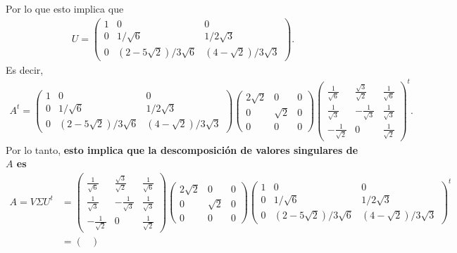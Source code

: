 \documentclass[11pt,letterpaper]{article}
\begin{document}
\begin{enumerate}
Por lo que esto implica que 
\begin{align*}
U = \begin{pmatrix}
1 & 0 & 0\\ 
0 & 1/\sqrt{6} &  1/2\sqrt{3}\\ 
0& (2-5\sqrt{2})/3\sqrt{6} & (4-\sqrt{2})/3\sqrt{3}
\end{pmatrix}.
\end{align*}
Es decir,
\begin{align*}
A^t = \begin{pmatrix}
1 & 0 & 0\\ 
0 & 1/\sqrt{6} &  1/2\sqrt{3}\\ 
0& (2-5\sqrt{2})/3\sqrt{6} & (4-\sqrt{2})/3\sqrt{3}
\end{pmatrix}
\begin{pmatrix}
2\sqrt{2} & 0 & 0\\
0 & \sqrt{2} & 0\\
0 & 0 & 0
\end{pmatrix}
 \begin{pmatrix}
\frac{1}{\sqrt{6}} & \frac{\sqrt{3}}{\sqrt{2}} & \frac{1}{\sqrt{6}}\\
\frac{1}{\sqrt{3}} & -\frac{1}{\sqrt{3}} & \frac{1}{\sqrt{3}}\\
-\frac{1}{\sqrt{2}} & 0 & \frac{1}{\sqrt{2}}
\end{pmatrix}^t.
\end{align*}
Por lo tanto, \textbf{esto implica que la descomposición de valores singulares de $A$ es}
\begin{align*}
A =V\Sigma U^t&= \begin{pmatrix}
\frac{1}{\sqrt{6}} & \frac{\sqrt{3}}{\sqrt{2}} & \frac{1}{\sqrt{6}}\\
\frac{1}{\sqrt{3}} & -\frac{1}{\sqrt{3}} & \frac{1}{\sqrt{3}}\\
-\frac{1}{\sqrt{2}} & 0 & \frac{1}{\sqrt{2}}
\end{pmatrix}
\begin{pmatrix}
2\sqrt{2} & 0 & 0\\
0 & \sqrt{2} & 0\\
0 & 0 & 0
\end{pmatrix}\begin{pmatrix}
1 & 0 & 0\\ 
0 & 1/\sqrt{6} &  1/2\sqrt{3}\\ 
0& (2-5\sqrt{2})/3\sqrt{6} & (4-\sqrt{2})/3\sqrt{3}
\end{pmatrix}^t\\
&= \begin{pmatrix}

\end{pmatrix}
\end{align*}
\end{enumerate}
\end{document}
